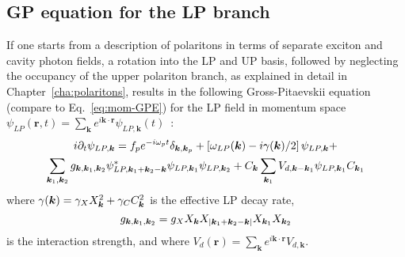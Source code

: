 \begin{subappendices}
\section{GP equation for the LP branch}
\label{app:full}
%
If one starts from a description of polaritons in terms of separate
exciton and cavity photon fields, a rotation into the LP and UP basis,
followed by neglecting the occupancy of the upper polariton branch, as
explained in detail in Chapter~\ref{cha:polaritons}, results in the
following Gross-Pitaevskii equation (compare to
Eq.~\eqref{eq:mom-GPE}) for the LP field in momentum space
$\psi_{LP}(\bm{r},t) = \sum_{\bm{k}} e^{i\bm{k}\cdot \bm{r}}
\psi_{LP,\bm{k}} (t)$~\cite{Ciuti_2003}:
%
\begin{multline}
  i\partial_t \psi_{LP,\bm{k}} = f_p e^{-i\omega_p t}
  \delta_{\bm{k},\bm{k}_p} + \left[\omega_{LP} (\kv) - i\gamma
    (\kv)/2\right]\psi_{LP,\bm{k}} +\\
%
  \sum_{\bm{k}_1, \bm{k}_2} g_{\bm{k}, \bm{k}_1, \bm{k}_2}
  \psi^*_{LP,\bm{k}_1 + \bm{k}_2-\bm{k}} \psi_{LP,\bm{k}_1}
  \psi_{LP,\bm{k}_2} + C_{\kv} \sum_{\bm{k}_1} V_{d,{\bm{k} - \bm{k}_1}} \psi_{LP,\bm{k}_1} C_{\kv_1}
\end{multline}
%
where $\gamma(\bm{k})=\gamma_X X^2_{\bm{k}} + \gamma_C C^2_{\bm{k}}$ is the effective LP
decay rate,
%
\begin{equation}
  g_{\bm{k}, \bm{k}_1, \bm{k}_2}=g_X X_{\bm{k}}X_{|\bm{k}_1 + \bm{k}_2-\bm{k}|} X_{\bm{k}_1} X_{\bm{k}_2}
\end{equation}
%
is the interaction strength, and where
$V_d(\bm{r}) = \sum_{\bm{k}} e^{i\bm{k}\cdot \bm{r}} V_{d,{\bm{k}}}$.


\end{subappendices}
